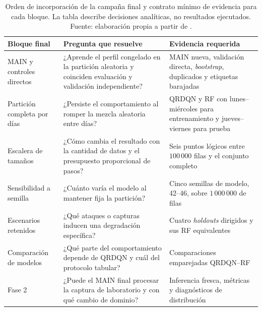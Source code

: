 \begin{table}[htbp]
\centering
\footnotesize
\setlength{\tabcolsep}{4pt}
\begin{tabular}{p{3.0cm}p{5.1cm}p{4.4cm}}
\toprule
Bloque final & Pregunta que resuelve & Evidencia requerida \\
\midrule
MAIN y controles directos & ¿Aprende el perfil congelado en la partición aleatoria y coinciden evaluación y validación independiente? & MAIN nueva, validación directa, \emph{bootstrap}, duplicados y etiquetas barajadas \\
Partición completa por días & ¿Persiste el comportamiento al romper la mezcla aleatoria entre días? & QRDQN y RF con lunes--miércoles para entrenamiento y jueves--viernes para prueba \\
Escalera de tamaños & ¿Cómo cambia el resultado con la cantidad de datos y el presupuesto proporcional de pasos? & Seis puntos lógicos entre $100\,000$ filas y el conjunto completo \\
Sensibilidad a semilla & ¿Cuánto varía el modelo al mantener fija la partición? & Cinco semillas de modelo, 42--46, sobre $1\,000\,000$ de filas \\
Escenarios retenidos & ¿Qué ataques o capturas inducen una degradación específica? & Cuatro \emph{holdouts} dirigidos y sus RF equivalentes \\
Comparación de modelos & ¿Qué parte del comportamiento depende de QRDQN y cuál del protocolo tabular? & Comparaciones emparejadas QRDQN--RF \\
Fase 2 & ¿Puede el MAIN final procesar la captura de laboratorio y con qué cambio de dominio? & Inferencia fresca, métricas y diagnósticos de distribución \\
\bottomrule
\end{tabular}
\caption[Estructura de los resultados finales]{Orden de incorporación de la campaña final y contrato mínimo de evidencia para cada bloque. La tabla describe decisiones analíticas, no resultados ejecutados. Fuente: elaboración propia a partir de .}
\label{tab:estructura-resultados-finales}
\end{table}


